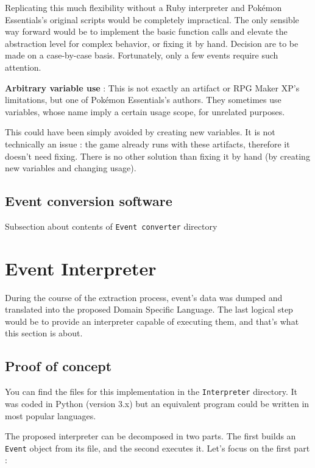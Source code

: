 \documentclass[11pt]{article}
\begin{document}
{Replicating this much flexibility without a Ruby interpreter and Pokémon Essentials's original scripts would be completely impractical. The only sensible way forward would be to implement the basic function calls and elevate the abstraction level for complex behavior, or fixing it by hand. Decision are to be made on a case-by-case basis. Fortunately, only a few events require such attention.

\textbf{Arbitrary variable use} : This is not exactly an artifact or RPG Maker XP's limitations, but one of Pokémon Essentials's authors. They sometimes use variables,  whose name imply a certain usage scope, for unrelated purposes. 

This could have been simply avoided by creating new variables. It is not technically an issue : the game already runs with these artifacts, therefore it doesn't need fixing. There is no other solution than fixing it by hand (by creating new variables and changing usage).




\subsection{Event conversion software}

Subsection about contents of \texttt{Event converter} directory






\newpage 
\section{Event Interpreter}


During the course of the extraction process, event's data was dumped and translated into the proposed Domain Specific Language. The last logical step would be to provide an interpreter capable of executing them, and that's what this section is about.

\subsection{Proof of concept}

You can find the files for this implementation in the \texttt{Interpreter} directory. It was coded in Python (version 3.x) but an equivalent program could be written in most popular languages.

The proposed interpreter can be decomposed in two parts. The first builds an \texttt{Event} object from its file, and the second executes it. Let's focus on the first part :

}
\end{document}
